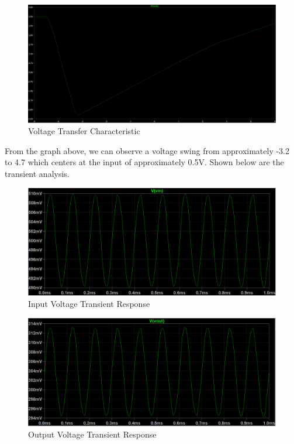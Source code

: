 \documentclass[12pt]{article}
\begin{document}
\begin{figure}[H]
\centering
\includegraphics[width=1.0\textwidth]{316.PNG}
\caption{Voltage Transfer Characteristic}
\end{figure}

From the graph above, we can observe a voltage swing from approximately -3.2 to 4.7 which centers at the input of approximately 0.5V. Shown below are the transient analysis.

\begin{figure}[H]
\centering
\includegraphics[width=1.0\textwidth]{316_in.PNG}
\caption{Input Voltage Transient Response}
\end{figure}

\begin{figure}[H]
\centering
\includegraphics[width=1.0\textwidth]{316_out.PNG}
\caption{Output Voltage Transient Response}
\end{figure}
\end{document}
